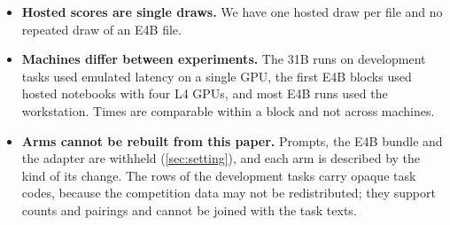 \begin{itemize}[leftmargin=*,itemsep=2pt,topsep=3pt]
measured for one E4B agent on Berth tasks. Another agent, another model or another task source can have a different
share.
\item \textbf{Hosted scores are single draws.} We have one hosted draw per file and no repeated draw of an E4B file.
\item \textbf{Machines differ between experiments.} The 31B runs on development tasks used emulated latency on a
single GPU, the first E4B blocks used hosted notebooks with four L4 GPUs, and most E4B runs used the workstation.
Times are comparable within a block and not across machines.
\item \textbf{Arms cannot be rebuilt from this paper.} Prompts, the E4B bundle and the adapter are withheld
(\cref{sec:setting}), and each arm is described by the kind of its change. The rows of the development tasks carry
opaque task codes, because the competition data may not be redistributed; they support counts and pairings and
cannot be joined with the task texts.
\end{itemize}
